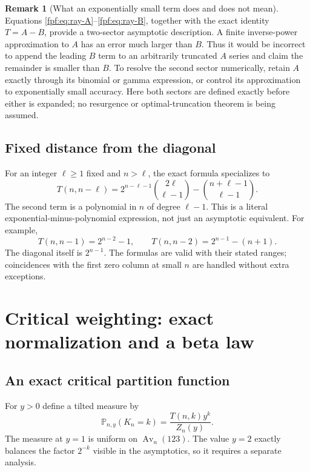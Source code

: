 \documentclass[11pt]{article}
\numberwithin{equation}{section}
\theoremstyle{definition}
\newtheorem{remark}[theorem]{Remark}
\newcommand{\Av}{\operatorname{Av}}
\newcommand{\Prob}{\mathbb P}
\begin{document}
\begin{remark}[What an exponentially small term does and does not mean]
Equations \eqref{fpf:eq:ray-A}--\eqref{fpf:eq:ray-B}, together with the exact
identity $T=A-B$, provide a two-sector asymptotic description. A finite
inverse-power approximation to $A$ has an error much larger than $B$.
Thus it would be incorrect to append the leading $B$ term to an arbitrarily
truncated $A$ series and claim the remainder is smaller than $B$. To
resolve the second sector numerically, retain $A$ exactly through its
binomial or gamma expression, or control its approximation to exponentially
small accuracy. Here both sectors are defined exactly before either is
expanded; no resurgence or optimal-truncation theorem is being assumed.
\end{remark}

\subsection{Fixed distance from the diagonal}
For an integer $\ell\ge1$ fixed and $n>\ell$, the exact formula specializes
to
\begin{equation}\label{fpf:eq:fixed-deficit}
 \boxed{\displaystyle
 T(n,n-\ell)=2^{n-\ell-1}\binom{2\ell}{\ell-1}
                    -\binom{n+\ell-1}{\ell-1}.}
\end{equation}
The second term is a polynomial in $n$ of degree $\ell-1$. This is a literal
exponential-minus-polynomial expression, not just an asymptotic equivalent.
For example,
\[
 T(n,n-1)=2^{n-2}-1,\qquad
 T(n,n-2)=2^{n-1}-(n+1).
\]
The diagonal itself is $2^{n-1}$. The formulas are valid with their stated
ranges; coincidences with the first zero column at small $n$ are handled
without extra exceptions.

\section{Critical weighting: exact normalization and a beta law}

\subsection{An exact critical partition function}
For $y>0$ define a tilted measure by
\begin{equation}\label{fpf:eq:tilt}
 \Prob_{n,y}(K_n=k)=\frac{T(n,k)y^k}{Z_n(y)}.
\end{equation}
The measure at $y=1$ is uniform on $\Av_n(123)$. The value $y=2$ exactly
balances the factor $2^{-k}$ visible in the asymptotics, so it requires a
separate analysis.
\end{document}
